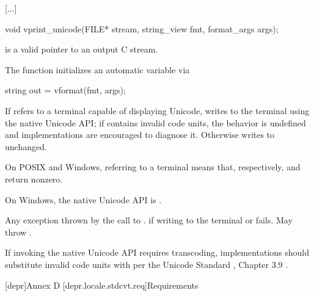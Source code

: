 \documentclass{wg21}
\begin{document}
\textcolor{noteclr}{[...]}

%
\begin{itemdecl}
    void vprint_unicode(FILE* stream, string_view fmt, format_args args);
\end{itemdecl}

\begin{itemdescr}
    \pnum
    \expects
     is a valid pointer to an output C stream.

    \pnum
    \effects
    The function initializes an automatic variable via
    \begin{codeblock}
        string out = vformat(fmt, args);
    \end{codeblock}
    If  refers to a terminal capable of displaying Unicode,
    writes  to the terminal using the native Unicode API;
    if  contains invalid code units,
    the behavior is undefined and
    implementations are encouraged to diagnose it.
    Otherwise writes  to  unchanged.
    \begin{note}
        On POSIX and Windows,  referring to a terminal means that,
        respectively,
         and
        return nonzero.
    \end{note}
    \begin{note}
        On Windows, the native Unicode API is .
    \end{note}

    \pnum
    \throws
    Any exception thrown by the call to .
     if writing to the terminal or  fails.
    May throw .

    \pnum
    \recommended
    If invoking the native Unicode API requires transcoding,
    implementations should substitute invalid code units
    with  per
    the Unicode Standard , Chapter 3.9 .
\end{itemdescr}

[depr]{Annex D}
[depr.locale.stdcvt.req]{Requirements}
\end{document}
